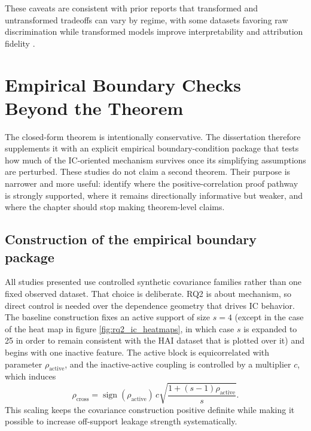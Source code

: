 These caveats are consistent with prior reports that transformed and untransformed tradeoffs can vary by regime, with some datasets favoring raw discrimination while transformed models improve interpretability and attribution fidelity \autocites{freijeirogonzalez2022,JOrender2025Efficient}.

\section{Empirical Boundary Checks Beyond the Theorem}

The closed-form theorem is intentionally conservative. The dissertation therefore supplements it with an explicit empirical boundary-condition package that tests how much of the IC-oriented mechanism survives once its simplifying assumptions are perturbed. These studies do not claim a second theorem. Their purpose is narrower and more useful: identify where the positive-correlation proof pathway is strongly supported, where it remains directionally informative but weaker, and where the chapter should stop making theorem-level claims.

\subsection{Construction of the empirical boundary package}

All studies presented use controlled synthetic covariance families rather than one fixed observed dataset. That choice is deliberate. RQ2 is about mechanism, so direct control is needed over the dependence geometry that drives IC behavior. The baseline construction fixes an active support of size $s=4$ (except in the case of the heat map in figure \ref{fig:rq2_ic_heatmaps}, in which case $s$ is expanded to 25 in order to remain consistent with the HAI dataset that is plotted over it) and begins with one inactive feature. The active block is equicorrelated with parameter $\rho_{\text{active}}$, and the inactive-active coupling is controlled by a multiplier $c$, which induces
\begin{equation}\label{eq:rq2-boundary-cross-correlation-scaling}
\rho_{\text{cross}} = \operatorname{sign}(\rho_{\text{active}})\, c\sqrt{\frac{1+(s-1)\rho_{\text{active}}}{s}}.
\end{equation}
This scaling keeps the covariance construction positive definite while making it possible to increase off-support leakage strength systematically.

